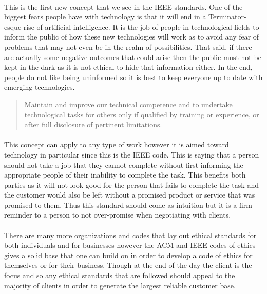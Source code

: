 \documentclass[notitlepage,a4paper,12pt]{article}
\begin{document}
\paragraph{}This is the first new concept that we see in the IEEE standards. One of the biggest fears people have with technology is that it will end in a Terminator-esque rise of artificial intelligence. It is the job of people in technological fields to inform the public of how these new technologies will work as to avoid any fear of problems that may not even be in the realm of possibilities. That said, if there are actually some negative outcomes that could arise then the public must not be kept in the dark as it is not ethical to hide that information either. In the end, people do not like being uninformed so it is best to keep everyone up to date with emerging technologies.
	\begin{quote}
	Maintain and improve our technical competence and to undertake technological tasks for others only if qualified by training or experience, or after full disclosure of pertinent limitations.
	\end{quote}
\paragraph{}This concept can apply to any type of work however it is aimed toward technology in particular since this is the IEEE code. This is saying that a person should not take a job that they cannot complete without first informing the appropriate people of their inability to complete the task. This benefits both parties as it will not look good for the person that fails to complete the task and the customer would also be left without a promised product or service that was promised to them. Thus this standard should come as intuition but it is a firm reminder to a person to not over-promise when negotiating with clients.
\paragraph{}There are many more organizations and codes that lay out ethical standards for both individuals and for businesses however the ACM and IEEE codes of ethics gives a solid base that one can build on in order to develop a code of ethics for themselves or for their business. Though at the end of the day the client is the focus and so any ethical standards that are followed should appeal to the majority of clients in order to generate the largest reliable customer base.
\end{document}
